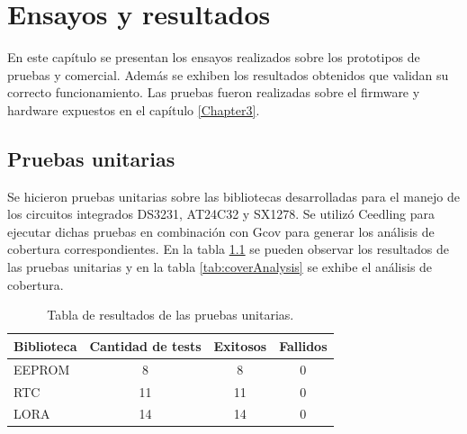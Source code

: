 
\chapter{Ensayos y resultados} %

\label{Chapter4} %



En este capítulo se presentan los ensayos realizados sobre los prototipos de pruebas y comercial. Además se exhiben los resultados obtenidos que validan su correcto funcionamiento. Las pruebas fueron realizadas sobre el firmware y hardware expuestos en el capítulo \ref{Chapter3}.


\section{Pruebas unitarias}
\label{sec:pruebasU}

Se hicieron pruebas unitarias sobre las bibliotecas desarrolladas para el manejo de los circuitos integrados DS3231, AT24C32 y SX1278. Se utilizó Ceedling para ejecutar dichas pruebas en combinación con Gcov para generar los análisis de cobertura correspondientes. En la tabla \ref{tab:resultsCeedling} se pueden observar los resultados de las pruebas unitarias y en la tabla \ref{tab:coverAnalysis} se exhibe el análisis de cobertura.

\begin{table}[h]
	\centering
	\caption[Pruebas unitarias]{Tabla de resultados de las pruebas unitarias.}
	\begin{tabular}{l c c c}    
		\toprule
		\textbf{Biblioteca} & \textbf{Cantidad de tests} & \textbf{Exitosos} & \textbf{Fallidos}  \\
		\midrule
		EEPROM & 8	& 8 & 0 \\		
		RTC & 11 & 11 & 0 \\
		LORA & 14 & 14 & 0 \\
		\bottomrule
		\hline
	\end{tabular}
	\label{tab:resultsCeedling}
\end{table}

